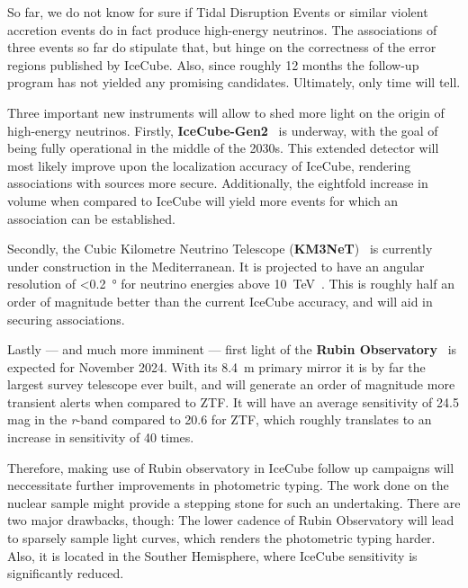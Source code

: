 So far, we do not know for sure if Tidal Disruption Events or similar violent accretion events do in fact produce high-energy neutrinos. The associations of three events so far do stipulate that, but hinge on the correctness of the error regions published by IceCube. Also, since roughly 12 months the follow-up program has not yielded any promising candidates. Ultimately, only time will tell.

Three important new instruments will allow to shed more light on the origin of high-energy neutrinos. Firstly, \textbf{IceCube-Gen2}~ is underway, with the goal of being fully operational in the middle of the 2030s. This extended detector will most likely improve upon the localization accuracy of IceCube, rendering associations with sources more secure. Additionally, the eightfold increase in volume when compared to IceCube will yield more events for which an association can be established.

Secondly, the Cubic Kilometre Neutrino Telescope (\textbf{KM3NeT})~ is currently under construction in the Mediterranean. It is projected to have an angular resolution of \SI{<0.2}{\degree} for neutrino energies above \SI{10}{\tera\eV}~. This is roughly half an order of magnitude better than the current IceCube accuracy, and will aid in securing associations.

Lastly --- and much more imminent --- first light of the \textbf{Rubin Observatory}~\cite{Ivezic2019} is expected for November 2024. With its \SI{8.4}{\m} primary mirror it is by far the largest survey telescope ever built, and will generate an order of magnitude more transient alerts when compared to ZTF. It will have an average sensitivity of 24.5 mag in the \textit{r}-band compared to 20.6 for ZTF, which roughly translates to an increase in sensitivity of 40 times.

Therefore, making use of Rubin observatory in IceCube follow up campaigns will neccessitate further improvements in photometric typing. The work done on the nuclear sample might provide a stepping stone for such an undertaking. There are two major drawbacks, though: The lower cadence of Rubin Observatory will lead to sparsely sample light curves, which renders the photometric typing harder. Also, it is located in the Souther Hemisphere, where IceCube sensitivity is significantly reduced.
